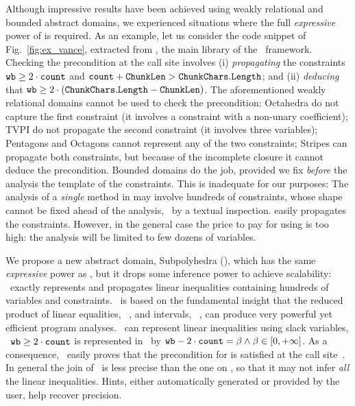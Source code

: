 \documentclass{llncs}
\begin{document}
Although impressive results have been achieved using weakly relational and bounded abstract domains, we experienced situations where the full  \emph{expressive} power of \Poly{} is required.
As an example, let us consider the code snippet of Fig.~\ref{fig:ex_vance}, extracted from , the main library of the \NET\ framework.
Checking the precondition at the call site \code{(*)}  involves (i) \emph{propagating} the constraints $\mathtt{wb} \geq 2 \cdot \mathtt{count}$ and $\mathtt{count}  +  \mathtt{ChunkLen > ChunkChars.Length}$; and (ii) \emph{deducing} that $\mathtt{wb} \geq  2 \cdot ( \mathtt{ChunkChars.\allowbreak Length}-\mathtt{ChunkLen})$. 
The aforementioned weakly relational domains cannot be used to check the precondition: Octahedra do not capture the first constraint (it involves a constraint with a non-unary coefficient); TVPI do not propagate the second constraint (it involves three variables); Pentagons and Octagons cannot represent any of the two constraints; Stripes can propagate both constraints, but because of the incomplete closure it cannot deduce the precondition.
Bounded domains do the job, provided we fix \emph{before} the analysis the  template of the constraints.
This is inadequate for our purposes: The analysis of a \emph{single} method in  may involve hundreds of constraints, whose shape cannot be fixed ahead of the analysis, \eg\ by a textual inspection.
\Polyhedra{} easily propagates the constraints. 
However, in the general case the price to pay for using \Polyhedra{}  is too high: the analysis will be limited to few dozens of variables.

We propose a new abstract domain, Subpolyhedra (\Subpoly), which has the same \emph{expressive} power as \Polyhedra, but it drops some  inference power to achieve scalability:
\Subpoly\  exactly represents and  propagates linear inequalities containing hundreds of variables and constraints. 
\Subpoly\ is based on the fundamental insight that the reduced product of linear equalities, \LinEq~\cite{Karr76}, and intervals, \Intervals~\cite{CousotCousot77}, can produce very powerful yet efficient program analyses.
\Subpoly\ can represent linear inequalities using slack variables, \eg\  $\mathtt{wb} \geq 2 \cdot \mathtt{count}$ is represented in \Subpoly\ by $\mathtt{wb} - 2 \cdot \mathtt{count} = \beta \wedge \beta \in [0, +\infty]$.
As a consequence, \Subpoly\  easily proves that  the precondition for  is satisfied at the call site~\code{(*)}.
In general the join of  \Subpoly\ is less precise than the one on \Polyhedra{}, so that it may not infer \emph{all} the linear inequalities.
Hints, either automatically generated or provided by the user, help recover precision.
\end{document}
